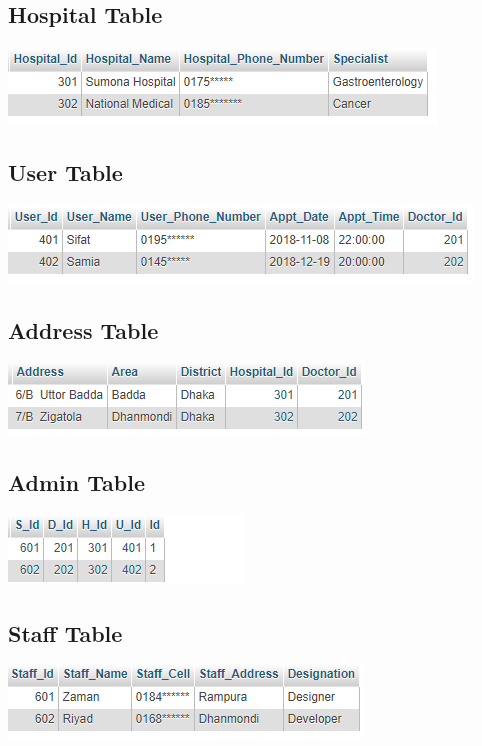 \documentclass[12pt]{article}
\begin{document}
\subsection{Hospital Table}

\includegraphics[scale = 0.99]{Thospital.PNG}

\subsection{User Table}

\includegraphics[scale = 0.99]{Tuser.PNG}


\subsection{Address Table}

\includegraphics[scale = 0.99]{TADD.PNG}

\subsection{Admin Table}

\includegraphics[scale = 0.99]{Tadmin.PNG}

\subsection{Staff Table}

\includegraphics[scale = 0.99]{Tstaff.PNG}
\end{document}
